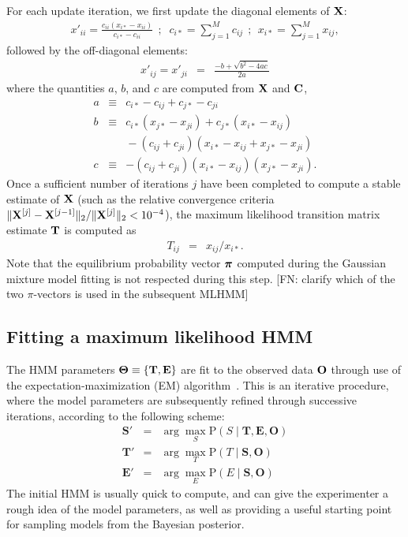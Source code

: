 \documentclass[aps,pre,twocolumn,superscriptaddress,nofootinbib,longbibliography]{revtex4-1}
\newcommand{\bfv}[1]{{\mbox{\boldmath{$#1$}}}}
\newcommand{\bfm}[1]{{\bf #1}}
\renewcommand{\Pr}{\mathrm{P}}
\begin{document}
{For each update iteration, we first update the diagonal elements of $\bfm{X}$:
\begin{eqnarray}
x'_{ii} = \frac{c_{ii} (x_{i*} - x_{ii})}{c_{i*} - c_{ii}}  \:\:;\;\; c_{i*} = \sum_{j=1}^M c_{ij} \:\:;\:\: x_{i*} = \sum_{j=1}^M x_{ij} ,
\end{eqnarray}
followed by the off-diagonal elements:
\begin{eqnarray}
x'_{ij} = x'_{ji} &=& \frac{-b + \sqrt{b^2 - 4 a c}}{2 a}
\end{eqnarray}
where the quantities $a$, $b$, and $c$ are computed from $\bfm{X}$ and $\bfm{C}$,
\begin{eqnarray}
a &\equiv& c_{i*} - c_{ij} + c_{j*} - c_{ji} \nonumber \\
b &\equiv& c_{i*} (x_{j*} - x_{ji}) + c_{j*} (x_{i*} - x_{ij}) \nonumber \\
&&\mbox{}- (c_{ij} + c_{ji}) (x_{i*} - x_{ij} + x_{j*} - x_{ji}) \nonumber \\
c &\equiv& - (c_{ij} + c_{ji}) (x_{i*} - x_{ij}) (x_{j*} - x_{ji}) .
\end{eqnarray}
Once a sufficient number of iterations $j$ have been completed to compute a stable estimate of $\bfm{X}$ (such as the relative convergence criteria $\|\bfm{X}^{[j]} - \bfm{X}^{[j-1]}\|_2 / \|\bfm{X}^{[j]}\|_2 < 10^{-4}$), the maximum likelihood transition matrix estimate $\bfm{T}$ is computed as
\begin{eqnarray}
T_{ij} &=& x_{ij} / x_{i*} . 
\end{eqnarray}
Note that the equilibrium probability vector $\bfv{\pi}$ computed during the Gaussian mixture model fitting is not respected during this step.
{\color{magenta}[FN: clarify which of the two $\pi$-vectors is used in the subsequent MLHMM]}

\subsection{Fitting a maximum likelihood HMM}
\label{section:fitting-mlhmm}

The HMM parameters $\bfm{\Theta} \equiv \{ \bfm{T}, \bfm{E} \}$ are fit to the observed data $\bfm{O}$ through use of the expectation-maximization (EM) algorithm~\cite{dempster-laird-rubin:1977:j-royal-statist-soc-b:em-algorithm}.
This is an iterative procedure, where the model parameters are subsequently refined through successive iterations, according to the following
scheme:
\color{magenta}
\begin{eqnarray}
\mathbf{S'} &=& \arg \max_S \Pr(S \mid \mathbf{T}, \mathbf{E}, \mathbf{O})\\
\mathbf{T'} &=& \arg \max_T \Pr(T \mid \mathbf{S}, \mathbf{O})\\
\mathbf{E'} &=& \arg \max_E \Pr(E \mid \mathbf{S}, \mathbf{O})
\end{eqnarray}
\color{black}
The initial HMM is usually quick to compute, and can give the experimenter a rough idea of the model parameters, as well as providing a useful starting point for sampling models from the Bayesian posterior.

}
\end{document}

